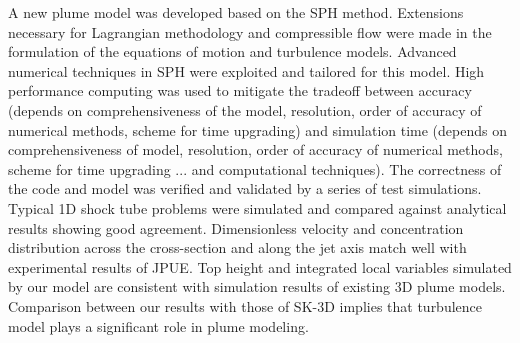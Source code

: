 \documentclass[gmd, manuscript]{copernicus}
\begin{document}
%
%
%

\conclusions  \label{sec:conclusion}%
A new plume model was developed based on the SPH method. Extensions necessary for Lagrangian methodology and compressible flow were made in the formulation of the equations of motion and turbulence models. Advanced numerical techniques in SPH were exploited and tailored for this model. High performance computing was used to mitigate the tradeoff between accuracy (depends on comprehensiveness of the model, resolution, order of accuracy of numerical methods, scheme for time upgrading) and simulation time (depends on comprehensiveness of model, resolution, order of accuracy of numerical methods, scheme for time upgrading ... and computational techniques). The correctness of the code and model was verified and validated by a series of test simulations. Typical 1D shock tube problems were simulated and compared against analytical results showing good agreement. Dimensionless velocity and concentration distribution across the cross-section and along the jet axis match well with experimental results of JPUE. Top height and integrated local variables simulated by our model are consistent with simulation results of existing 3D plume models. Comparison between our results with those of SK-3D implies that turbulence model plays a significant role in plume modeling.
\end{document}

